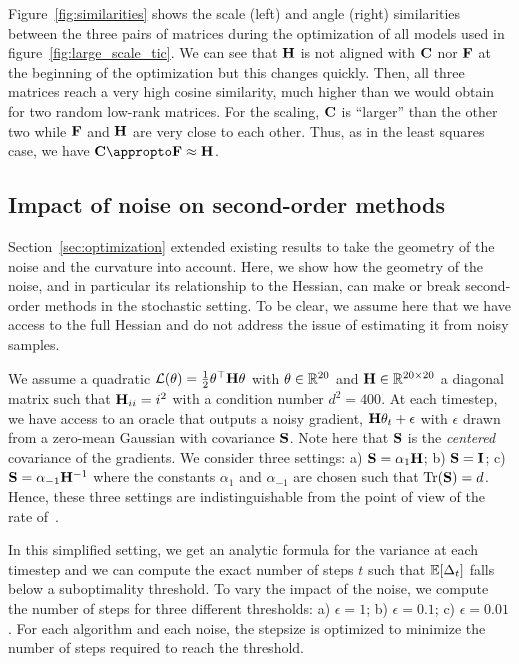 Figure~\ref{fig:similarities} shows the scale (left) and angle (right) similarities between the three pairs of matrices during the optimization of all models used in figure~\ref{fig:large_scale_tic}. We can see that ${\mathbf{H}}$ is not aligned with ${\mathbf{C}}$ nor ${\mathbf{F}}$ at the beginning of the optimization but this changes quickly. Then, all three matrices reach a very high cosine similarity, much higher than we would obtain for two random low-rank matrices. For the scaling, ${\mathbf{C}}$ is ``larger'' than the other two while ${\mathbf{F}}$ and ${\mathbf{H}}$ are very close to each other. Thus, as in the least squares case, we have $\rmC \appropto \rmF \approx \rmH$.

\subsection{Impact of noise on second-order methods}
Section~\ref{sec:optimization} extended existing results to take the geometry of the noise and the curvature into account. Here, we show how the geometry of the noise, and in particular its relationship to the Hessian, can make or break second-order methods in the stochastic setting. To be clear, we assume here that we have access to the full Hessian and do not address the issue of estimating it from noisy samples.

We assume a quadratic $\mathcal{L}(\theta) = \tfrac{1}{2} \theta^\top {\mathbf{H}} \theta$ with $\theta \in \mathbb{R}^{20}$ and ${\mathbf{H}} \in \mathbb{R}^{20\times 20}$ a diagonal matrix such that ${\mathbf{H}}_{ii} = i^2$ with a condition number $d^2 = 400$. At each timestep, we have access to an oracle that outputs a noisy gradient, ${\mathbf{H}}\theta_t + \epsilon$ with $\epsilon$ drawn from a zero-mean Gaussian with covariance ${\mathbf{S}}$. Note here that ${\mathbf{S}}$ is the \emph{centered} covariance of the gradients. We consider three settings: a) ${\mathbf{S}} = \alpha_1 {\mathbf{H}}$; b) ${\mathbf{S}} = {\mathbf{I}}$; c) ${\mathbf{S}} = \alpha_{-1} {\mathbf{H}}^{-1}$ where the constants $\alpha_1$ and $\alpha_{-1}$ are chosen such that $\operatorname{Tr}({\mathbf{S}}) = d$. Hence, these three settings are indistinguishable from the point of view of the rate of~\citet{schmidt2014convergence}.

In this simplified setting, we get an analytic formula for the variance at each timestep and we can compute the exact number of steps $t$ such that $\mathbb{E}[\Delta_t]$ falls below a suboptimality threshold. To vary the impact of the noise, we compute the number of steps for three different thresholds: a) $\epsilon = 1$; b) $\epsilon = 0.1$; c) $\epsilon = 0.01$. For each algorithm and each noise, the stepsize is optimized to minimize the number of steps required to reach the threshold.

